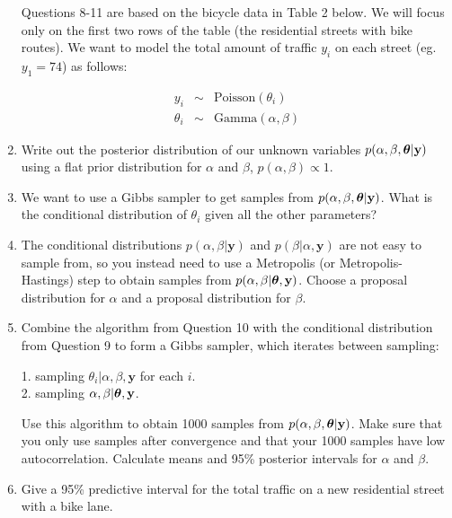 \documentclass[12pt]{article}
\def\y{\mathbf{y}}
\newcommand{\bth}{\mbox{\boldmath $\theta$}}
\begin{document}
\begin{enumerate}
	\vspace{.05cm} Questions 8-11 are based on the bicycle data in Table 2 below. We will focus only on the first two rows of the table (the residential streets with bike routes). We want to model the total amount of traffic $y_i$ on each street (eg. $y_1=74$) as follows:
	
	\begin{eqnarray*}
		y_i & \sim & \mbox{Poisson}(\theta_i)\\
		\theta_i & \sim & \mbox{Gamma}(\alpha,\beta) 
	\end{eqnarray*}
	
	\item Write out the posterior distribution of our unknown variables $p(\alpha,\beta,\bth|\y)$ using a flat prior distribution for $\alpha$ and $\beta$, $p(\alpha,\beta) \propto 1$.
	
	\item We want to use a Gibbs sampler to get samples from $p(\alpha,\beta,\bth|\y)$. What is the conditional distribution of $\theta_i$ given all the other parameters?
	
	\item The conditional distributions $p(\alpha,\beta|\y)$ and $p(\beta|\alpha,\y)$ are not easy to sample from, so you instead need to use a Metropolis (or Metropolis-Hastings) step to obtain samples from $p(\alpha,\beta|\bth,\y)$. Choose a proposal distribution for $\alpha$ and a proposal distribution for $\beta$.
	
	\item Combine the algorithm from Question 10 with the conditional distribution from Question 9 to form a Gibbs sampler, which iterates between sampling:
	
	1. sampling $\theta_i | \alpha,\beta,\y$ for each $i$.\\
	2. sampling $\alpha,\beta|\bth,\y$.
	
	Use this algorithm to obtain 1000 samples from $p(\alpha,\beta,\bth|\y)$. Make sure that you only use samples after convergence and that your 1000 samples have low autocorrelation. Calculate means and 95\% posterior intervals for $\alpha$ and $\beta$.
	
	\item Give a 95\% predictive interval for the total traffic on a new residential street with a bike lane. 
\end{enumerate}
\newpage
\end{document}
